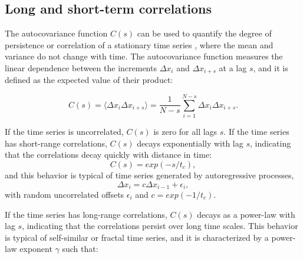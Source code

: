 
\subsection{Long and short-term correlations}

The autocovariance function $C(s)$ can be used to quantify the degree of persistence or correlation of a stationary time series \cite{kantelhardt2008fractal}, where the mean and variance do not change with time. The autocovariance function measures the linear dependence between the increments $\Delta x_i$ and $\Delta x_{i+s}$ at a lag $s$, and it is defined as the expected value of their product:

\begin{equation}
C(s) = \langle \Delta x_i \Delta x_{i+s} \rangle = \frac{1}{N-s} \sum_{i=1}^{N-s}\Delta x_i \Delta x_{i+s}.
\end{equation}

If the time series is uncorrelated, $C(s)$ is zero for all lags $s$. If the time series has short-range correlations, $C(s)$ decays exponentially with lag $s$, indicating that the correlations decay quickly with distance in time:
$$C(s) = exp(-s/t_c),$$
and this behavior is typical of time series generated by autoregressive processes,
$$ \Delta x_i = c\Delta x_{i-1} + \epsilon_i ,$$
with random uncorrelated offsets $\epsilon_i$ and $c = exp(-1/t_c)$.
 
 If the time series has long-range correlations, $C(s)$ decays as a power-law with lag $s$, indicating that the correlations persist over long time scales. This behavior is typical of self-similar or fractal time series, and it is characterized by a power-law exponent $\gamma$ such that:
 
